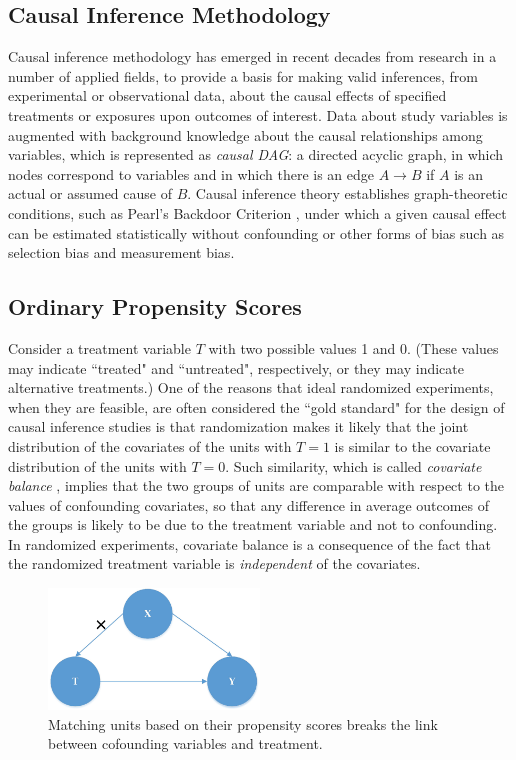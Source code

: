 \subsection{Causal Inference Methodology}\label{IIIA}
Causal inference methodology \cite{Pearl2003} has emerged in recent decades from research in a number of applied fields, to provide a basis for making valid inferences, from experimental or observational data, about the causal effects of specified treatments or exposures upon outcomes of interest.  Data about study variables is augmented with background knowledge about the causal relationships among variables, which is represented as {\it causal DAG}: a directed acyclic graph, in which nodes correspond to variables and in which there is an edge $A \to B$ if $A$ is an actual or assumed cause of $B$.  Causal inference theory establishes graph-theoretic conditions, such as Pearl's Backdoor Criterion \cite{Pearl2003}, under which a given causal effect can be estimated statistically without confounding or other forms of bias such as selection bias and measurement bias.



\subsection{Ordinary Propensity Scores}\label{IIIB}
Consider a treatment variable $T$ with two possible values 1 and 0.  (These values may indicate ``treated" and ``untreated", respectively, or they may indicate alternative treatments.)  One of the reasons that ideal randomized experiments, when they are feasible, are often considered the ``gold standard" for the design of causal inference studies \cite{Grossman2005} is that randomization makes it likely that the joint distribution of the covariates of the units with $T=1$ is similar to the covariate distribution of the units with $T=0$.  Such similarity, which is called {\it covariate balance} \cite{Rosenbaum1983}, implies that the two groups of units are comparable with respect to the values of confounding covariates, so that any difference in average outcomes of the groups is likely to be due to the treatment variable and not to confounding.  In randomized experiments, covariate balance is a consequence of the fact that the randomized treatment variable is {\it independent} of the covariates.

\begin{figure}[!thpb]
\centering
\includegraphics[width=0.5\textwidth]{CausalDAG2.eps}
\caption{Matching units based on their propensity scores breaks the link between cofounding variables and treatment.}
\label{dag2}
\end{figure}

